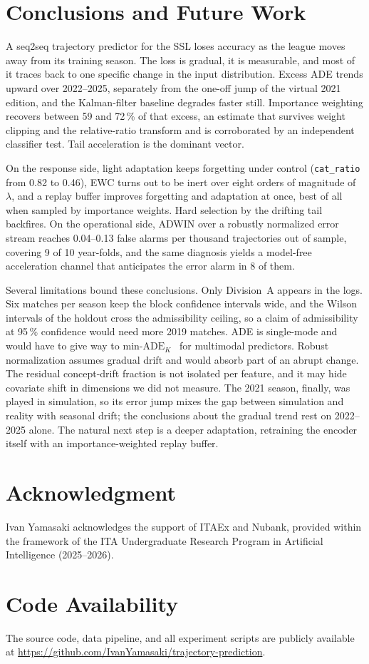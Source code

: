 \documentclass[conference]{IEEEtran}
\begin{document}
\section{Conclusions and Future Work}
\label{sec:conclusion}

A seq2seq trajectory predictor for the SSL loses accuracy as the league moves
away from its training season. The loss is gradual, it is measurable, and most
of it traces back to one specific change in the input distribution. Excess ADE
trends upward over 2022--2025, separately from the one-off jump of the virtual
2021 edition, and the Kalman-filter baseline degrades faster still. Importance
weighting recovers between 59 and 72\,\% of that excess, an estimate that
survives weight clipping and the relative-ratio transform and is corroborated
by an independent classifier test. Tail acceleration is the dominant vector.

On the response side, light adaptation keeps forgetting under control
(\texttt{cat\_ratio} from 0.82 to 0.46), EWC turns out to be inert over eight
orders of magnitude of $\lambda$, and a replay buffer improves forgetting and
adaptation at once, best of all when sampled by importance weights. Hard
selection by the drifting tail backfires. On the operational side, ADWIN over a
robustly normalized error stream reaches 0.04--0.13 false alarms per thousand
trajectories out of sample, covering 9 of 10 year-folds, and the same diagnosis
yields a model-free acceleration channel that anticipates the error alarm in 8
of them.

Several limitations bound these conclusions. Only Division~A appears in the
logs. Six matches per season keep the block confidence intervals wide, and the
Wilson intervals of the holdout cross the admissibility ceiling, so a claim of
admissibility at 95\,\% confidence would need more 2019 matches. ADE is
single-mode and would have to give way to
$\text{min-ADE}_K$~\cite{salzmann2020,yuan2021} for multimodal predictors.
Robust normalization assumes gradual drift and would absorb part of an abrupt
change. The residual concept-drift fraction is not isolated per feature, and it
may hide covariate shift in dimensions we did not measure. The 2021 season,
finally, was played in simulation, so its error jump mixes the gap between
simulation and reality with seasonal drift; the conclusions about the gradual
trend rest on 2022--2025 alone. The natural next step is a deeper adaptation,
retraining the encoder itself with an importance-weighted replay buffer.

\section*{Acknowledgment}
Ivan Yamasaki acknowledges the support of ITAEx and Nubank, provided within
the framework of the ITA Undergraduate Research Program in Artificial
Intelligence (2025--2026).

\section*{Code Availability}
The source code, data pipeline, and all experiment scripts are publicly
available at \url{https://github.com/IvanYamasaki/trajectory-prediction}.



\end{document}
